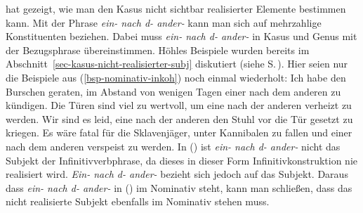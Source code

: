 \citet*[Kapitel~6]{Hoehle83a}
hat gezeigt, wie man den Kasus nicht sichtbar realisierter Elemente bestimmen kann. Mit der Phrase
{\em ein- nach d- ander-} kann 
man sich auf mehrzahlige Konstituenten beziehen. Dabei muss {\em ein- nach d- ander-}
in Kasus und Genus mit der Bezugsphrase übereinstimmen. Höhles Beispiele wurden
bereits im Abschnitt~\ref{sec-kasus-nicht-realisierter-subj} diskutiert (siehe S.\,\pageref{bsp-tueren-hoehle}).
Hier seien nur die Beispiele aus (\ref{bsp-nominativ-inkoh}) noch einmal wiederholt:
\ealnoraggedright
\label{bsp-nominativ-inkoh-zwei}
\ex Ich habe den Burschen geraten, im Abstand von wenigen Tagen einer nach dem anderen
      zu kündigen.\label{bsp-nominativ-inkoh-geraten-zwei}
\ex Die Türen sind viel zu wertvoll, um eine nach der anderen verheizt zu werden.
\ex Wir sind es leid, eine nach der anderen den Stuhl vor die Tür gesetzt zu kriegen.
\ex Es wäre fatal für die Sklavenjäger, unter Kannibalen zu fallen und einer nach dem
      anderen verspeist zu werden.
\zl
In () ist {\em ein- nach d- ander-} nicht das Subjekt der Infinitivverbphrase,
da dieses in dieser Form Infinitivkonstruktion nie realisiert wird. {\em Ein- nach d- ander-} bezieht sich
jedoch auf das Subjekt. Daraus dass {\em ein- nach d- ander-} in () im Nominativ
steht, kann man schließen, dass das nicht realisierte Subjekt ebenfalls im Nominativ
stehen muss.


